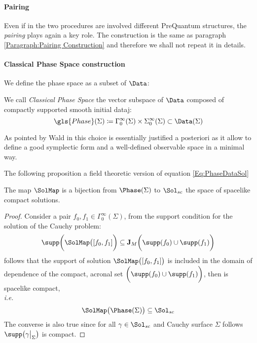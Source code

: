 \documentclass[Main]{subfiles}
\begin{document}
		\paragraph{Pairing}
		Even if in the two procedures are involved different PreQuantum structures, the \emph{pairing} plays again a key role.
		The construction is the same as paragraph \ref{Paragraph:Pairing Construction} and therefore we shall not repeat it in details.

		\paragraph{Classical Phase Space construction}
			We define the phase space as a subset of $\Data$:
			\begin{definition}
				We call \emph{Classical Phase Space} the vector subspace of $\Data$ composed of compactly supported smooth initial dataj:
				\begin{displaymath}
					\gls{Phase}(\Sigma) \coloneqq \Gamma_0^\infty(\Sigma) \times \Sigma_0^\infty (\Sigma) \subset \Data(\Sigma)			
				\end{displaymath}				
			\end{definition}			
			As pointed by Wald in \cite{Wald1994} this choice is essentially justified a posteriori as it allow to define a good symplectic form and a well-defined observable space in a minimal way.
			
			The following proposition a field theoretic version of equation \ref{Eq:PhaseDataSol}
			\begin{proposition}
				The map $\SolMap$ is a bijection from $\Phase(\Sigma)$ to $\Sol_{sc}$ the space of spacelike compact solutions.			
			\end{proposition}
			\begin{proof}
				Consider a pair $f_0, f_1 \in \Gamma_0^\infty(\Sigma)$, from the support condition for the solution of the Cauchy problem:
				\danger
				\begin{equation}\label{Eq:SupportoCauchySol}
					\supp\biggr( \SolMap \big([f_0,f_1] \biggr) \subseteq \mathbf{J}_M \biggr( \supp(f_0) \cup \supp(f_1) \biggr)
				\end{equation}
				follows that the support of solution $\SolMap \big([f_0,f_1]\big) $	is included in the domain of dependence of the compact, acronal	set $\biggr( \supp(f_0) \cup \supp(f_1) \biggr)$, then is spacelike compact,\\ \textit{i.e.}
				\begin{displaymath}
					\SolMap \big( \Phase(\Sigma)\big) \subseteq \Sol_{sc}
				\end{displaymath}
				The converse is also true since for all $\gamma \in \Sol_{sc}$ and Cauchy surface $\Sigma$ follows $\supp\big( \gamma \big\vert_\Sigma \big)$ is compact.
			\end{proof}
\end{document}

